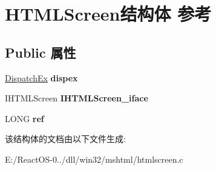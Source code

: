 \hypertarget{struct_h_t_m_l_screen}{}\section{H\+T\+M\+L\+Screen结构体 参考}
\label{struct_h_t_m_l_screen}
\subsection*{Public 属性}
\begin{DoxyCompactItemize}
\item 
\mbox{\label{struct_h_t_m_l_screen_acaa0ea34c0082fc7bfccfe6c10d6cb58}} 
\hyperlink{struct_dispatch_ex}{Dispatch\+Ex} {\bfseries dispex}
\item 
\mbox{\label{struct_h_t_m_l_screen_a3d4b4f8582adfe546ec137959cd8f5c0}} 
I\+H\+T\+M\+L\+Screen {\bfseries I\+H\+T\+M\+L\+Screen\+\_\+iface}
\item 
\mbox{\label{struct_h_t_m_l_screen_a215daf01614501f4339f98d1f93d49cd}} 
L\+O\+NG {\bfseries ref}
\end{DoxyCompactItemize}


该结构体的文档由以下文件生成\+:\begin{DoxyCompactItemize}
\item 
E\+:/\+React\+O\+S-\/0../dll/win32/mshtml/htmlscreen.\+c\end{DoxyCompactItemize}
